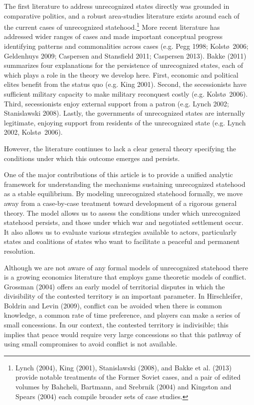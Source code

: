 \documentclass[11pt,letterpaper, notitlepage]{article}
\begin{document}
The first literature to address unrecognized states directly was grounded in comparative politics, and a robust area-studies literature exists around each of the current cases of unrecognized statehood.\footnote{Lynch (2004), King (2001), Stanislawski (2008), and Bakke et al. (2013) provide notable treatments of the Former Soviet cases, and a pair of edited volumes by Bahcheli, Bartmann, and Srebrnik (2004) and Kingston and Spears (2004) each compile broader sets of case studies.} More recent literature has addressed wider ranges of cases and made important conceptual progress identifying patterns and commonalities across cases (e.g. Pegg 1998; Kolst\o \ 2006; Geldenhuys 2009; Caspersen and Stansfield 2011; Caspersen 2013). Bakke (2011) summarizes four explanations for the persistence of unrecognized states, each of which plays a role in the theory we develop here. First, economic and political elites benefit from the status quo (e.g. King 2001). Second, the secessionists have sufficient military capacity to make military reconquest costly (e.g. Kolst\o \ 2006). Third, secessionists enjoy external support from a patron (e.g. Lynch 2002; Stanislawski 2008). Lastly, the governments of unrecognized states are internally legitimate, enjoying support from residents of the unrecognized state (e.g. Lynch 2002, Kolst\o \ 2006).

However, the literature continues to lack a clear general theory specifying the conditions under which this outcome emerges and persists. 

One of the major contributions of this article is to provide a unified analytic framework for understanding the mechanisms sustaining unrecognized statehood as a stable equilibrium. By modeling unrecognized statehood formally, we move away from a case-by-case treatment toward development of a rigorous general theory. The model allows us to assess the conditions under which unrecognized statehood persists, and those under which war and negotiated settlement occur. It also allows us to evaluate various strategies available to actors, particularly states and coalitions of states who want to facilitate a peaceful and permanent resolution.

Although we are not aware of any formal models of unrecognized statehood there is a growing economics literature that employs game theoretic models of conflict. Grossman (2004) offers an early model of territorial disputes in which the divisibility of the contested territory is an important parameter. In Hirschleifer, Boldrin and Levin (2009), conflict can be avoided when there is common knowledge, a common rate of time preference, and players can make a series of small concessions. In our context, the contested territory is indivisible; this implies that peace would require very large concessions so that this pathway of using small compromises to avoid conflict is not available.
\end{document}
